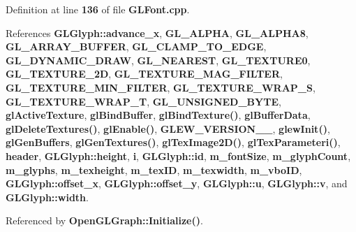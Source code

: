 Definition at line {\bf 136} of file {\bf G\+L\+Font.\+cpp}.



References {\bf G\+L\+Glyph\+::advance\+\_\+x}, {\bf G\+L\+\_\+\+A\+L\+P\+HA}, {\bf G\+L\+\_\+\+A\+L\+P\+H\+A8}, {\bf G\+L\+\_\+\+A\+R\+R\+A\+Y\+\_\+\+B\+U\+F\+F\+ER}, {\bf G\+L\+\_\+\+C\+L\+A\+M\+P\+\_\+\+T\+O\+\_\+\+E\+D\+GE}, {\bf G\+L\+\_\+\+D\+Y\+N\+A\+M\+I\+C\+\_\+\+D\+R\+AW}, {\bf G\+L\+\_\+\+N\+E\+A\+R\+E\+ST}, {\bf G\+L\+\_\+\+T\+E\+X\+T\+U\+R\+E0}, {\bf G\+L\+\_\+\+T\+E\+X\+T\+U\+R\+E\+\_\+2D}, {\bf G\+L\+\_\+\+T\+E\+X\+T\+U\+R\+E\+\_\+\+M\+A\+G\+\_\+\+F\+I\+L\+T\+ER}, {\bf G\+L\+\_\+\+T\+E\+X\+T\+U\+R\+E\+\_\+\+M\+I\+N\+\_\+\+F\+I\+L\+T\+ER}, {\bf G\+L\+\_\+\+T\+E\+X\+T\+U\+R\+E\+\_\+\+W\+R\+A\+P\+\_\+S}, {\bf G\+L\+\_\+\+T\+E\+X\+T\+U\+R\+E\+\_\+\+W\+R\+A\+P\+\_\+T}, {\bf G\+L\+\_\+\+U\+N\+S\+I\+G\+N\+E\+D\+\_\+\+B\+Y\+TE}, {\bf gl\+Active\+Texture}, {\bf gl\+Bind\+Buffer}, {\bf gl\+Bind\+Texture()}, {\bf gl\+Buffer\+Data}, {\bf gl\+Delete\+Textures()}, {\bf gl\+Enable()}, {\bf G\+L\+E\+W\+\_\+\+V\+E\+R\+S\+I\+O\+N\+\_\+\_}, {\bf glew\+Init()}, {\bf gl\+Gen\+Buffers}, {\bf gl\+Gen\+Textures()}, {\bf gl\+Tex\+Image2\+D()}, {\bf gl\+Tex\+Parameteri()}, {\bf header}, {\bf G\+L\+Glyph\+::height}, {\bf i}, {\bf G\+L\+Glyph\+::id}, {\bf m\+\_\+font\+Size}, {\bf m\+\_\+glyph\+Count}, {\bf m\+\_\+glyphs}, {\bf m\+\_\+texheight}, {\bf m\+\_\+tex\+ID}, {\bf m\+\_\+texwidth}, {\bf m\+\_\+vbo\+ID}, {\bf G\+L\+Glyph\+::offset\+\_\+x}, {\bf G\+L\+Glyph\+::offset\+\_\+y}, {\bf G\+L\+Glyph\+::u}, {\bf G\+L\+Glyph\+::v}, and {\bf G\+L\+Glyph\+::width}.



Referenced by {\bf Open\+G\+L\+Graph\+::\+Initialize()}.



